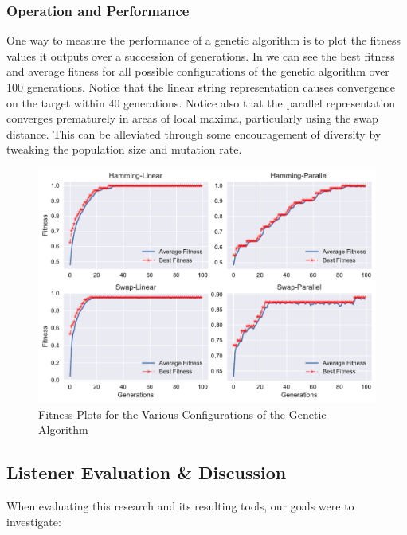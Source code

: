 \subsubsection{Operation and Performance}

One way to measure the performance of a genetic algorithm is to plot the fitness values it outputs over a succession of generations. In  we can see the best fitness and average fitness for all possible configurations of the genetic algorithm over 100 generations. Notice that the linear string representation causes convergence on the target within 40 generations. Notice also that the parallel representation converges prematurely in areas of local maxima, particularly using the swap distance. This can be alleviated through some encouragement of diversity by tweaking the population size and mutation rate.

\begin{figure}
	\begin{center}
		\includegraphics[width=\figSizeHundred]{ch03_symbolic/figures/best_average_fitness.pdf}
	\end{center}
	\caption[Fitness Plots for the Various Configurations of the Genetic Algorithm]{Fitness Plots for the Various Configurations of the Genetic Algorithm}
	\label{fig:genetic}
\end{figure}

\subsection{Listener Evaluation \& Discussion}

When evaluating this research and its resulting tools, our goals were to investigate:

